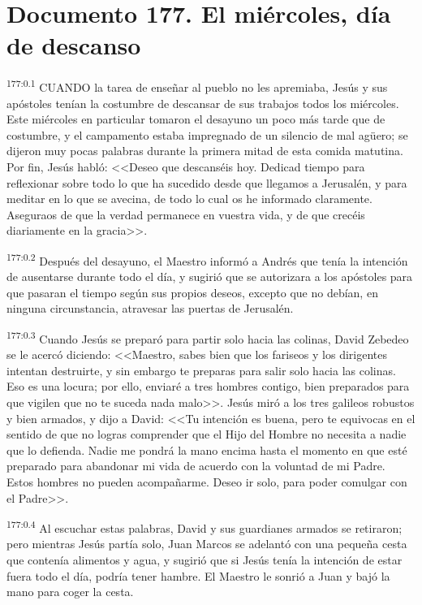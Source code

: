 \chapter{Documento 177. El miércoles, día de descanso}
\par 
\textsuperscript{177:0.1} CUANDO la tarea de enseñar al pueblo no les apremiaba, Jesús y sus apóstoles tenían la costumbre de descansar de sus trabajos todos los miércoles. Este miércoles en particular tomaron el desayuno un poco más tarde que de costumbre, y el campamento estaba impregnado de un silencio de mal ag\"uero; se dijeron muy pocas palabras durante la primera mitad de esta comida matutina. Por fin, Jesús habló: <<Deseo que descanséis hoy. Dedicad tiempo para reflexionar sobre todo lo que ha sucedido desde que llegamos a Jerusalén, y para meditar en lo que se avecina, de todo lo cual os he informado claramente. Aseguraos de que la verdad permanece en vuestra vida, y de que crecéis diariamente en la gracia>>.

\par 
\textsuperscript{177:0.2} Después del desayuno, el Maestro informó a Andrés que tenía la intención de ausentarse durante todo el día, y sugirió que se autorizara a los apóstoles para que pasaran el tiempo según sus propios deseos, excepto que no debían, en ninguna circunstancia, atravesar las puertas de Jerusalén.

\par 
\textsuperscript{177:0.3} Cuando Jesús se preparó para partir solo hacia las colinas, David Zebedeo se le acercó diciendo: <<Maestro, sabes bien que los fariseos y los dirigentes intentan destruirte, y sin embargo te preparas para salir solo hacia las colinas. Eso es una locura; por ello, enviaré a tres hombres contigo, bien preparados para que vigilen que no te suceda nada malo>>. Jesús miró a los tres galileos robustos y bien armados, y dijo a David: <<Tu intención es buena, pero te equivocas en el sentido de que no logras comprender que el Hijo del Hombre no necesita a nadie que lo defienda. Nadie me pondrá la mano encima hasta el momento en que esté preparado para abandonar mi vida de acuerdo con la voluntad de mi Padre. Estos hombres no pueden acompañarme. Deseo ir solo, para poder comulgar con el Padre>>.

\par 
\textsuperscript{177:0.4} Al escuchar estas palabras, David y sus guardianes armados se retiraron; pero mientras Jesús partía solo, Juan Marcos se adelantó con una pequeña cesta que contenía alimentos y agua, y sugirió que si Jesús tenía la intención de estar fuera todo el día, podría tener hambre. El Maestro le sonrió a Juan y bajó la mano para coger la cesta.

